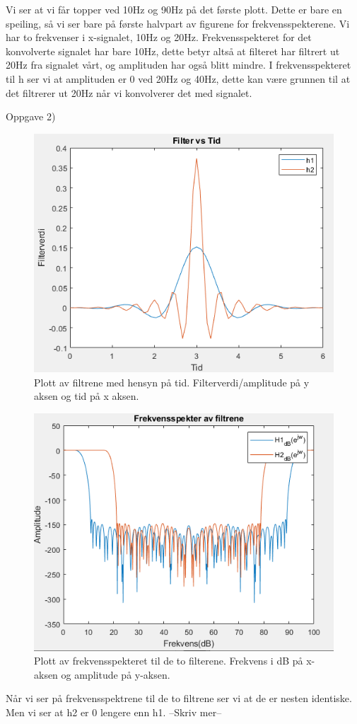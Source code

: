 \documentclass[11pt]{article}
\begin{document}
Vi ser at vi får topper ved 10Hz og 90Hz på det første plott. Dette er bare en speiling, så vi ser bare på første halvpart av figurene for frekvensspekterene. Vi har to frekvenser i x-signalet, 10Hz og 20Hz. Frekvensspekteret for det konvolverte signalet har bare 10Hz, dette betyr altså at filteret har filtrert ut 20Hz fra signalet vårt, og amplituden har også blitt mindre. I frekvensspekteret til h ser vi at amplituden er 0 ved 20Hz og 40Hz, dette kan være grunnen til at det filtrerer ut 20Hz når vi konvolverer det med signalet.

Oppgave 2)
\begin{figure}[H]
\includegraphics[scale=0.9]{2a_firtid.png}
\caption{Plott av filtrene med hensyn på tid. Filterverdi/amplitude på y aksen og tid på x aksen.}
\end{figure}

\begin{figure}[H]
\includegraphics[scale=0.9]{2a_firfrek.png}
\caption{Plott av frekvensspekteret til de to filterene. Frekvens i dB på x-aksen og amplitude på y-aksen.}
\end{figure}

Når vi ser på frekvensspektrene til de to filtrene ser vi at de er nesten identiske. Men vi ser at h2 er 0 lengere enn h1. --Skriv mer--
\end{document}
